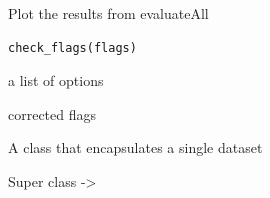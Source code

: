 \documentclass[letterpaper]{book}
\begin{document}
%
\begin{Description}
Plot the results from evaluateAll
\end{Description}
%
\begin{Usage}
\begin{verbatim}
check_flags(flags)
\end{verbatim}
\end{Usage}
%
\begin{Arguments}
\begin{ldescription}
\item[\code{flags}] a list of options
\end{ldescription}
\end{Arguments}
%
\begin{Value}
corrected flags
\end{Value}
%
\begin{Description}
A class that encapsulates a single dataset
\end{Description}
%
\begin{Section}{Super class}
 -> 
\end{Section}
%
\end{document}
